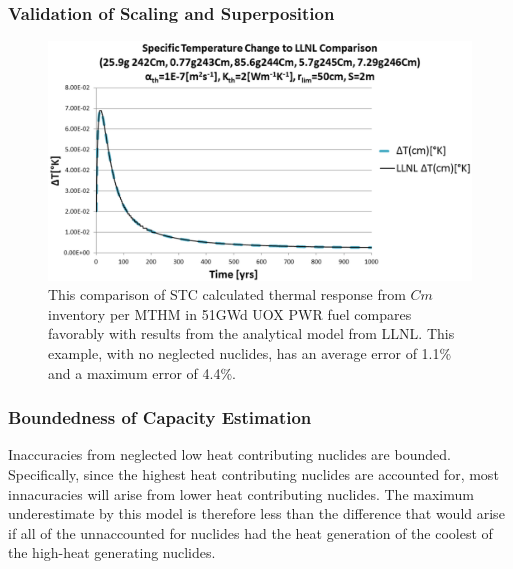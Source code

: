 \begin{frame}
\frametitle{Validation of Scaling and Superposition}
\footnotesize{

\begin{figure}[htp!]
\begin{center}
\includegraphics[width=\columnwidth]{./cyder/thermal_models/CmValidation.eps}
\end{center}
\caption{This comparison of \gls{STC} calculated thermal response from $Cm$ 
inventory per MTHM in 51GWd UOX PWR fuel compares favorably with results 
from the analytical model from LLNL. This example, with no neglected nuclides, 
has an average error of 1.1\% and a maximum error of 4.4\%.
} 
\label{fig:CmValidation}
\end{figure}
}
\end{frame}

\begin{frame}[ctb!]
\frametitle{Boundedness of Capacity Estimation}
Inaccuracies from neglected low heat contributing nuclides are bounded. 
Specifically, since the highest heat contributing nuclides are accounted for, 
most innacuracies will arise from lower heat contributing nuclides. The maximum 
underestimate by this model is therefore less than the difference that would 
arise if all of the unnaccounted for nuclides had the heat generation of the 
coolest of the high-heat generating nuclides.
\end{frame}
